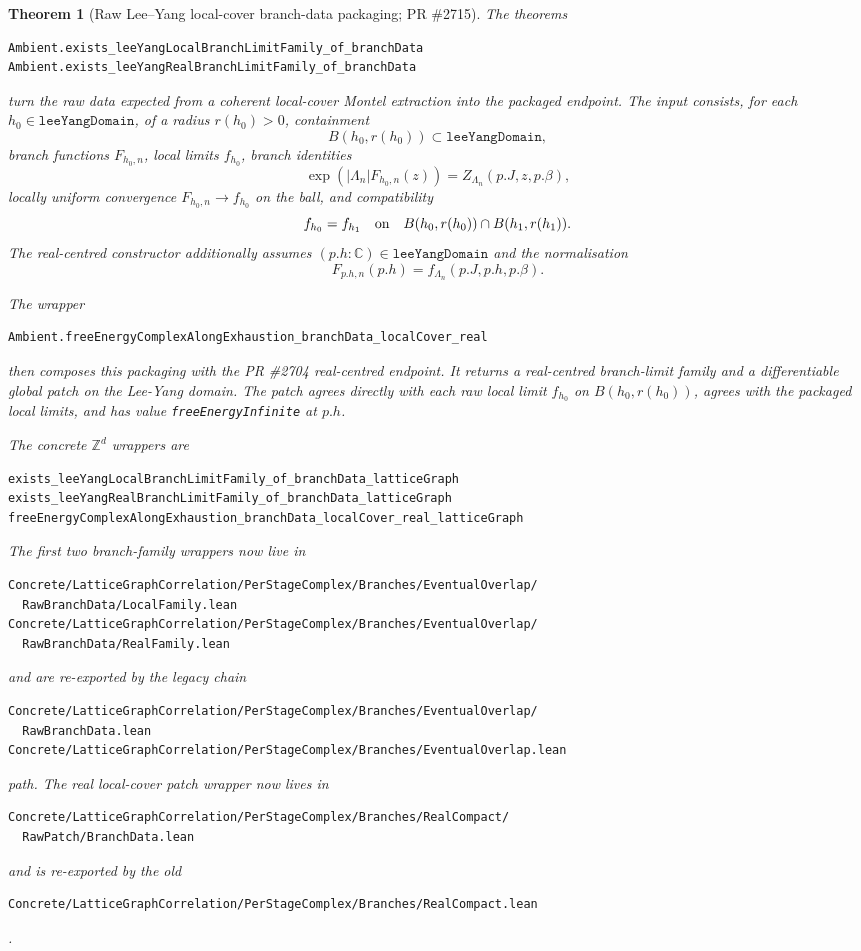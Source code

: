 \documentclass[a4paper,11pt]{article}
\newtheorem{theorem}{Theorem}
\begin{document}
\begin{theorem}[Raw Lee--Yang local-cover branch-data packaging; PR \#2715]
The theorems
\begin{Verbatim}
Ambient.exists_leeYangLocalBranchLimitFamily_of_branchData
Ambient.exists_leeYangRealBranchLimitFamily_of_branchData
\end{Verbatim}
turn the raw data expected from a coherent local-cover Montel extraction into
the packaged endpoint.  The input consists, for each
\(h_0\in\texttt{leeYangDomain}\), of a radius \(r(h_0)>0\), containment
\[
  B(h_0,r(h_0))\subset\texttt{leeYangDomain},
\]
branch functions \(F_{h_0,n}\), local limits \(f_{h_0}\), branch identities
\[
  \exp(|\Lambda_n|F_{h_0,n}(z))
    = Z_{\Lambda_n}(p.J,z,p.\beta),
\]
locally uniform convergence \(F_{h_0,n}\to f_{h_0}\) on the ball, and
compatibility
\[
  f_{h_0}=f_{h_1}
  \quad\hbox{on}\quad
  B(h_0,r(h_0))\cap B(h_1,r(h_1)).
\]
The real-centred constructor additionally assumes
\((p.h:\mathbb C)\in\texttt{leeYangDomain}\) and the normalisation
\[
  F_{p.h,n}(p.h)
    = f_{\Lambda_n}(p.J,p.h,p.\beta).
\]

The wrapper
\begin{Verbatim}
Ambient.freeEnergyComplexAlongExhaustion_branchData_localCover_real
\end{Verbatim}
then composes this packaging with the PR \#2704 real-centred endpoint.  It
returns a real-centred branch-limit family and a differentiable global patch
on the Lee-Yang domain.  The patch agrees directly with each raw local limit
\(f_{h_0}\) on \(B(h_0,r(h_0))\), agrees with the packaged local limits, and
has value \texttt{freeEnergyInfinite} at \(p.h\).

The concrete \(\mathbb Z^d\) wrappers are
\begin{Verbatim}
exists_leeYangLocalBranchLimitFamily_of_branchData_latticeGraph
exists_leeYangRealBranchLimitFamily_of_branchData_latticeGraph
freeEnergyComplexAlongExhaustion_branchData_localCover_real_latticeGraph
\end{Verbatim}
The first two branch-family wrappers now live in
\begin{Verbatim}
Concrete/LatticeGraphCorrelation/PerStageComplex/Branches/EventualOverlap/
  RawBranchData/LocalFamily.lean
Concrete/LatticeGraphCorrelation/PerStageComplex/Branches/EventualOverlap/
  RawBranchData/RealFamily.lean
\end{Verbatim}
and are re-exported by the legacy chain
\begin{Verbatim}
Concrete/LatticeGraphCorrelation/PerStageComplex/Branches/EventualOverlap/
  RawBranchData.lean
Concrete/LatticeGraphCorrelation/PerStageComplex/Branches/EventualOverlap.lean
\end{Verbatim}
path.  The real local-cover patch wrapper now lives in
\begin{Verbatim}
Concrete/LatticeGraphCorrelation/PerStageComplex/Branches/RealCompact/
  RawPatch/BranchData.lean
\end{Verbatim}
and is re-exported by the old
\begin{Verbatim}
Concrete/LatticeGraphCorrelation/PerStageComplex/Branches/RealCompact.lean
\end{Verbatim}
.


\end{theorem}
\end{document}
